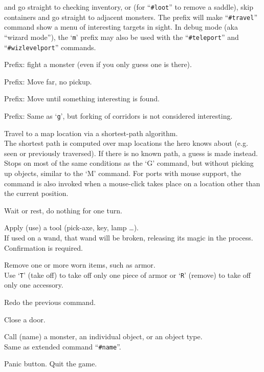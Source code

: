 and go straight to checking inventory,
or (for ``{\tt \#loot}'' to remove a saddle),
skip containers and go straight to adjacent monsters. The prefix will
make ``{\tt \#travel}'' command show a menu of interesting targets in sight.
In debug mode (aka ``wizard mode''), the `{\tt m}' prefix may also be
used with the ``{\tt \#teleport}'' and ``{\tt \#wizlevelport}'' commands.
\item[\tb{F[yuhjklbn]}]
Prefix:  fight a monster (even if you only guess one is there).
\item[\tb{M[yuhjklbn]}]
Prefix:  Move far, no pickup.
\item[\tb{g[yuhjklbn]}]
Prefix:  Move until something interesting is found.
\item[\tb{G[yuhjklbn] {\rm or} <CONTROL->[yuhjklbn]}]
Prefix:  Same as `{\tt g}', but forking of corridors is not considered
interesting.
\item[\tb{_}]
Travel to a map location via a shortest-path algorithm.\\
The shortest path
is computed over map locations the hero knows about (e.g. seen or
previously traversed).  If there is no known path, a guess is made instead.
Stops on most of
the same conditions as the `G' command, but without picking up
objects, similar to the `M' command.  For ports with mouse
support, the command is also invoked when a mouse-click takes place on a
location other than the current position.
\item[\tb{.}]
Wait or rest, do nothing for one turn.
\item[\tb{a}]
Apply (use) a tool (pick-axe, key, lamp \ldots).\\
If used on a wand, that wand will be broken, releasing its magic in the
process.  Confirmation is required.
\item[\tb{A}]
Remove one or more worn items, such as armor.\\
Use `{\tt T}' (take off) to take off only one piece of armor
or `{\tt R}' (remove) to take off only one accessory.
\item[\tb{\^{}A}]
Redo the previous command.
\item[\tb{c}]
Close a door.
\item[\tb{C}]
Call (name) a monster, an individual object, or an object type.\\
Same as extended command ``{\tt \#name}''.
\item[\tb{\^{}C}]
Panic button.  Quit the game.
